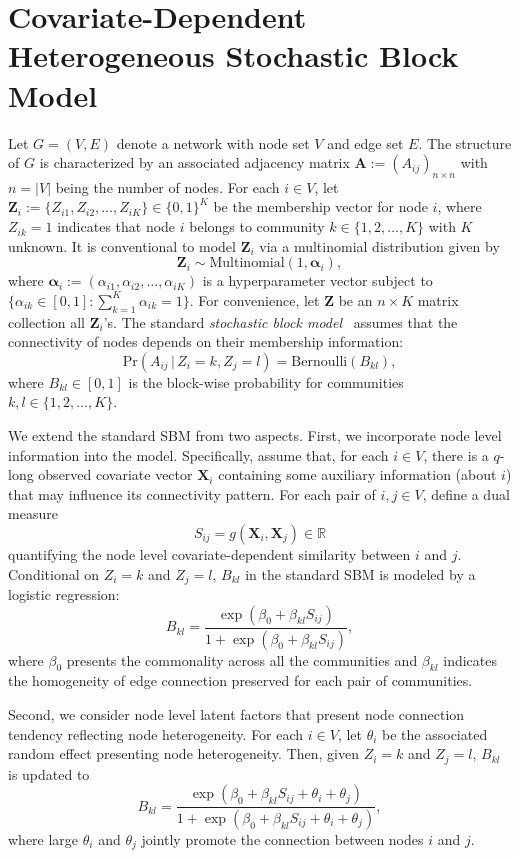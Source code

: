 \documentclass[12pt, titlepage, a4paper]{article}
\newcommand{\Prob}{\bm{\mathrm{Pr}}}
\newcommand{\given}{\, \vert \,}
\begin{document}
\section{Covariate-Dependent Heterogeneous Stochastic Block Model}
\label{sec:cdhsbm}

Let $G = (V, E)$ denote a network with node set $V$ and edge set 
$E$. The structure of $G$ is characterized by an associated 
adjacency matrix $\bm{A}:=(A_{ij})_{n \times n}$ with $n = |V|$ 
being the number of nodes. For each $i \in V$, let $\bm{Z}_i := 
\{Z_{i1}, Z_{i2}, \ldots, Z_{iK}\} \in \{0, 1\}^{K}$ be the 
membership vector for node $i$, where $Z_{ik} = 1$ indicates that 
node $i$ belongs to community $k \in \{1, 2, \ldots, K\}$ with $K$ 
unknown. It is conventional to model $\bm{Z}_i$ via a multinomial 
distribution given by
\[
\bm{Z}_i \sim \mathrm{Multinomial}(1, \bm{\alpha}_i),
\]
where $\bm{\alpha}_i := (\alpha_{i1}, \alpha_{i2}, \ldots, 
\alpha_{iK})$ is a hyperparameter vector subject to $\{\alpha_{ik} 
\in [0, 1]:\sum_{k = 1}^{K} \alpha_{ik} = 1\}$. For convenience, let 
$\bm{Z}$ be an $n \times K$ matrix collection all $\bm{Z}_i$'s. The 
standard {\em stochastic block 
model}~\citep[SBM,][]{nowicki2001estimation, abbe2018community} 
assumes that the connectivity of nodes depends on their membership 
information:
\[
\Prob(A_{ij}\given Z_i = k, Z_j = l) = \mathrm{Bernoulli}(B_{kl}),
\]
where $B_{kl} \in [0, 1]$ is the block-wise probability for 
communities $k, l \in \{1, 2, \ldots, K\}$. 


We extend the standard SBM from two aspects. First, we incorporate 
node level information into the model. Specifically, assume that, 
for each $i \in V$, there is a $q$-long observed covariate vector 
$\bm{X}_i$ containing some auxiliary information (about $i$) that 
may influence its connectivity pattern. For each pair of $i, j \in 
V$, define a dual measure 
\[S_{ij} = g(\bm{X}_i, \bm{X}_j) \in \mathbb{R}\] 
quantifying the node level covariate-dependent similarity between 
$i$ and $j$. Conditional on $Z_{i} = k$ and $Z_{j} = l$, $B_{kl}$ in 
the standard SBM is modeled by a logistic regression: 
\[
B_{kl} = \frac{\exp(\beta_0 + \beta_{kl} S_{ij})}{1 + \exp(\beta_0 + 
\beta_{kl} S_{ij})},
\]
where $\beta_0$ presents the commonality across all the communities 
and $\beta_{kl}$ indicates the homogeneity of edge connection 
preserved for each pair of communities. 


Second, we consider node level latent factors that present node 
connection tendency reflecting node heterogeneity. For each $i \in 
V$, let $\theta_i$ be the associated random effect presenting node 
heterogeneity. Then, given $Z_i = k$ and $Z_j = l$, $B_{kl}$ is 
updated to
\[
B_{kl} = \frac{\exp(\beta_0 + \beta_{kl} S_{ij} + \theta_i + 
\theta_j)}{1 + \exp(\beta_0 + \beta_{kl} S_{ij} + \theta_i + 
\theta_j)},
\]
where large $\theta_i$ and $\theta_j$ jointly promote the connection 
between nodes $i$ and $j$.
\end{document}
